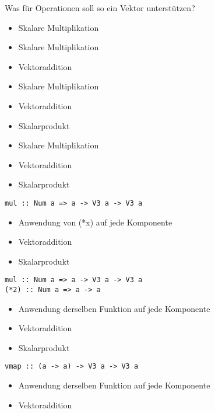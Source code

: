 \documentclass{beamer}
\begin{document}
\begin{frame}[fragile]
Was für Operationen soll so ein Vektor unterstützen?
\pause
\begin{overprint}
\begin{itemize}
 \item Skalare Multiplikation
\end{itemize}
\begin{itemize}
 \item Skalare Multiplikation
 \item Vektoraddition
\end{itemize}
\begin{itemize}
 \item Skalare Multiplikation
 \item Vektoraddition
 \item Skalarprodukt
\end{itemize}
\begin{itemize}
 \item Skalare Multiplikation
 \item Vektoraddition
 \item Skalarprodukt
\end{itemize}
\begin{verbatim}
mul :: Num a => a -> V3 a -> V3 a
\end{verbatim}
\begin{itemize}
 \item Anwendung von (*x) auf jede Komponente
 \item Vektoraddition
 \item Skalarprodukt
\end{itemize}
\begin{verbatim}
mul :: Num a => a -> V3 a -> V3 a
(*2) :: Num a => a -> a
\end{verbatim}
\begin{itemize}
 \item Anwendung derselben Funktion auf jede Komponente
 \item Vektoraddition
 \item Skalarprodukt
\end{itemize}
\begin{verbatim}
vmap :: (a -> a) -> V3 a -> V3 a
\end{verbatim}
\begin{itemize}
 \item Anwendung derselben Funktion auf jede Komponente
 \item Vektoraddition

\end{itemize}
\end{overprint}
\end{frame}
\end{document}

